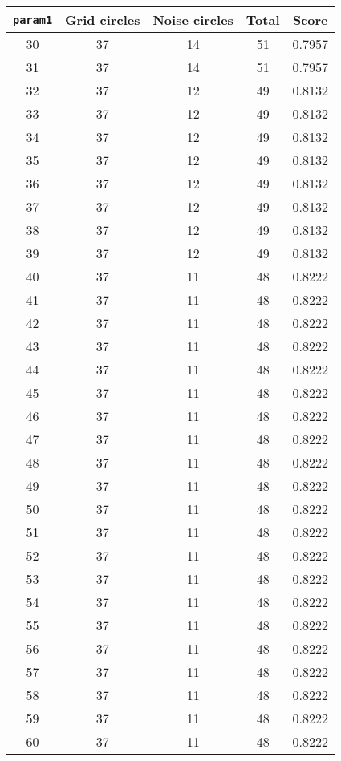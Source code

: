 \documentclass[letterpaper, 12pt]{article}
\begin{document}
\begin{longtable}{|c|c|c|c|c|}
\hline
\textbf{\texttt{param1}} & \textbf{Grid circles} & \textbf{Noise circles} & \textbf{Total} & \textbf{Score} \\
\hline
30 & 37 & 14 & 51 & 0.7957 \\
\hline
31 & 37 & 14 & 51 & 0.7957 \\
\hline
32 & 37 & 12 & 49 & 0.8132 \\
\hline
33 & 37 & 12 & 49 & 0.8132 \\
\hline
34 & 37 & 12 & 49 & 0.8132 \\
\hline
35 & 37 & 12 & 49 & 0.8132 \\
\hline
36 & 37 & 12 & 49 & 0.8132 \\
\hline
37 & 37 & 12 & 49 & 0.8132 \\
\hline
38 & 37 & 12 & 49 & 0.8132 \\
\hline
39 & 37 & 12 & 49 & 0.8132 \\
\hline
40 & 37 & 11 & 48 & 0.8222 \\
\hline
41 & 37 & 11 & 48 & 0.8222 \\
\hline
42 & 37 & 11 & 48 & 0.8222 \\
\hline
43 & 37 & 11 & 48 & 0.8222 \\
\hline
44 & 37 & 11 & 48 & 0.8222 \\
\hline
45 & 37 & 11 & 48 & 0.8222 \\
\hline
46 & 37 & 11 & 48 & 0.8222 \\
\hline
47 & 37 & 11 & 48 & 0.8222 \\
\hline
48 & 37 & 11 & 48 & 0.8222 \\
\hline
49 & 37 & 11 & 48 & 0.8222 \\
\hline
50 & 37 & 11 & 48 & 0.8222 \\
\hline
51 & 37 & 11 & 48 & 0.8222 \\
\hline
52 & 37 & 11 & 48 & 0.8222 \\
\hline
53 & 37 & 11 & 48 & 0.8222 \\
\hline
54 & 37 & 11 & 48 & 0.8222 \\
\hline
55 & 37 & 11 & 48 & 0.8222 \\
\hline
56 & 37 & 11 & 48 & 0.8222 \\
\hline
57 & 37 & 11 & 48 & 0.8222 \\
\hline
58 & 37 & 11 & 48 & 0.8222 \\
\hline
59 & 37 & 11 & 48 & 0.8222 \\
\hline
60 & 37 & 11 & 48 & 0.8222 \\

\end{longtable}
\end{document}
